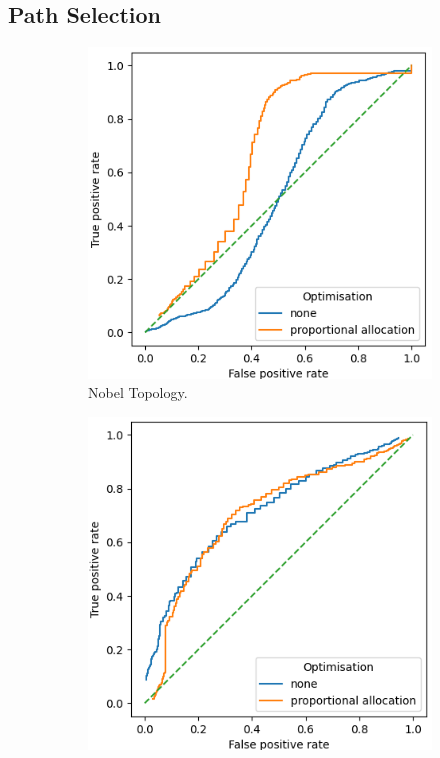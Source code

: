 \subsection{Path Selection}
\label{ssec:Rpathselection}
\noindent
\begin{figure}
    \centering
    \begin{subfigure}{0.475\textwidth}
        \includegraphics[width=\textwidth]{figs/results/nobel-germany_ac2_opt.png}
        \caption{Nobel Topology.}
    \end{subfigure}
    \begin{subfigure}{0.475\textwidth}
        \includegraphics[width=\textwidth]{figs/results/france_ac2_opt.png}

\end{subfigure}
\end{figure}
